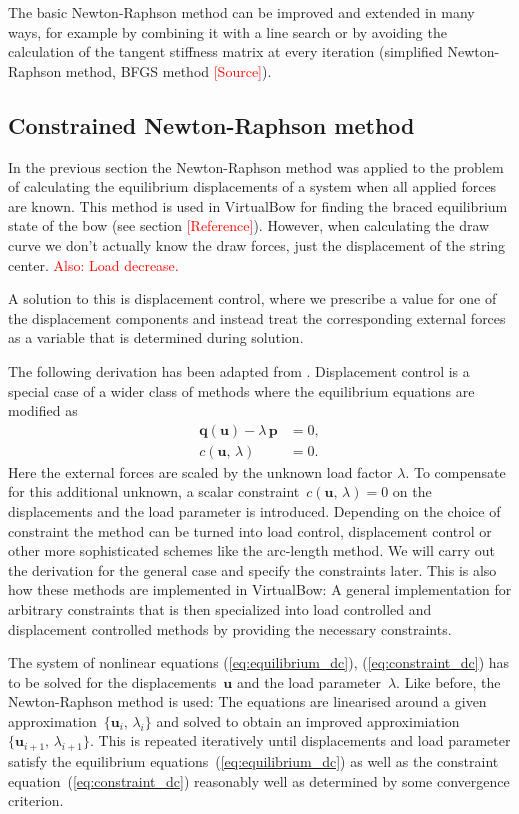 The basic Newton-Raphson method can be improved and extended in many ways, for example by combining it with a line search or by avoiding the calculation of the tangent stiffness matrix at every iteration (simplified Newton-Raphson method, BFGS method \textcolor{red}{[Source]}).

\subsection{Constrained Newton-Raphson method}

In the previous section the Newton-Raphson method was applied to the problem of calculating the equilibrium displacements of a system when all applied forces are known. This method is used in VirtualBow for finding the braced equilibrium state of the bow (see section \textcolor{red}{[Reference]}). However, when calculating the draw curve we don't actually know the draw forces, just the displacement of the string center. \textcolor{red}{Also: Load decrease.}

A solution to this is displacement control, where we prescribe a value for one of the displacement components and instead treat the corresponding external forces as a variable that is determined during solution.

The following derivation has been adapted from \cite{fem_script_uni_bochum}. Displacement control is a special case of a wider class of methods where the equilibrium equations are modified as
%
\begin{align}
\boldsymbol{q}(\boldsymbol{u}) - \lambda\,\boldsymbol{p} &= 0,\label{eq:equilibrium_dc}\\
c(\boldsymbol{u},\,\lambda) &= 0.\label{eq:constraint_dc}
\end{align}
%
Here the external forces are scaled by the unknown load factor $\lambda$. To compensate for this additional unknown, a scalar constraint~$c(\boldsymbol{u},\,\lambda) = 0$ on the displacements and the load parameter is introduced. Depending on the choice of constraint the method can be turned into load control, displacement control or other more sophisticated schemes like the arc-length method. We will carry out the derivation for the general case and specify the constraints later. This is also how these methods are implemented in VirtualBow: A general implementation for arbitrary constraints that is then specialized into load controlled and displacement controlled methods by providing the necessary constraints.

The system of nonlinear equations (\ref{eq:equilibrium_dc}), (\ref{eq:constraint_dc}) has to be solved for the displacements~$\boldsymbol{u}$ and the load parameter~$\lambda$. Like before, the Newton-Raphson method is used: The equations are linearised around a given approximation~$\{\boldsymbol{u}_i,\,\lambda_i\}$ and solved to obtain an improved approximiation~$\{\boldsymbol{u}_{i+1},\,\lambda_{i+1}\}$. This is repeated iteratively until displacements and load parameter satisfy the equilibrium equations~(\ref{eq:equilibrium_dc}) as well as the constraint equation~(\ref{eq:constraint_dc}) reasonably well as determined by some convergence criterion.

